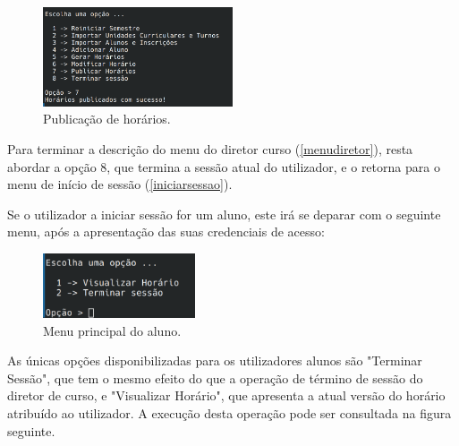 \documentclass[12pt, a4paper]{article}
\begin{document}
\begin{figure}[H]
    \centering
    \includegraphics[width=0.5\textwidth]{Imagens/Manual/DiretorCurso-7.png}
    \caption{Publicação de horários.}
\end{figure}

Para terminar a descrição do menu do diretor curso (\ref{menudiretor}), resta abordar a opção 8, que
termina a sessão atual do utilizador, e o retorna para o menu de início de sessão
(\ref{iniciarsessao}).

Se o utilizador a iniciar sessão for um aluno, este irá se deparar com o seguinte menu, após a
apresentação das suas credenciais de acesso:

\begin{figure}[H]
    \centering
    \includegraphics[width=0.4\textwidth]{Imagens/Manual/Aluno.png}
    \caption{Menu principal do aluno.}
\end{figure}

As únicas opções disponibilizadas para os utilizadores alunos são "Terminar Sessão", que tem o
mesmo efeito do que a operação de término de sessão do diretor de curso, e "Visualizar Horário",
que apresenta a atual versão do horário atribuído ao utilizador. A execução desta operação pode ser
consultada na figura seguinte.
\end{document}
